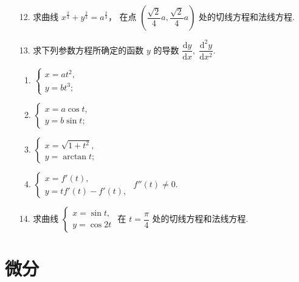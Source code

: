 \begin{enumerate}
    \item[12.] 求曲线 $x^{\frac{2}{3}}+y^{\frac{2}{3}}=a^{\frac{2}{3}}$，
    在点 $\left(\dfrac{\sqrt{2}}{4}a,\dfrac{\sqrt{2}}{4}a\right)$ 处的切线方程和法线方程.

    \item[13.] 求下列参数方程所确定的函数 $y$ 的导数 $\dfrac{\text{d}y}{\text{d}x},\;\dfrac{\text{d}^2y}{\text{d}x^2}$.
    \begin{enumerate}[(1)]\setlength{\itemsep}{5pt}\setlength{\topsep}{15pt}
        \item $\begin{cases}
            x=at^2,\\
            y=bt^3;
        \end{cases}$
        \item $\begin{cases}
            x=a\cos t,\\
            y=b\sin t;
        \end{cases}$
        \item $\begin{cases}
            x=\sqrt{1+t^2},\\
            y=\arctan t;
        \end{cases}$
        \item $\begin{cases}
            x=f'(t),\\
            y=tf'(t)-f'(t),
        \end{cases}$ $f''(t)\not=0$.
    \end{enumerate}

    \item[14.] 求曲线 $\begin{cases}
        x=\sin t,\\
        y=\cos 2t
    \end{cases}$  
    在 $t=\dfrac{\pi}{4}$ 处的切线方程和法线方程.

\end{enumerate}


\section{微分}

